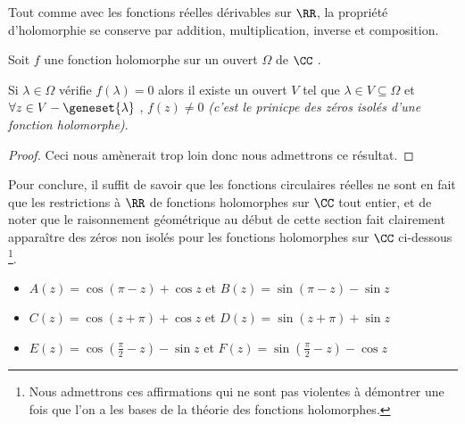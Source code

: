 \medskip

Tout comme avec les fonctions réelles dérivables sur $\RR$, la propriété d'holomorphie se conserve par addition, multiplication, inverse et composition.


\medskip

\begin{fact} \label{holo-nullity}
	Soit $f$ une fonction holomorphe sur un ouvert $\Omega$ de $\CC$ . 
	
	\smallskip
	
	Si $\lambda \in \Omega$ vérifie $f(\lambda) = 0$ alors il existe un ouvert $V$ tel que $\lambda \in V \subseteq \Omega$ et $\forall z \in V - \geneset{\lambda}$ , $f(z) \neq 0$ 
	\emph{(c'est le prinicpe des zéros isolés d'une fonction holomorphe)}. 
\end{fact}


\begin{proof}
	Ceci nous amènerait trop loin donc nous admettrons ce résultat.
\end{proof}


\medskip

Pour conclure, il suffit de savoir que les fonctions circulaires réelles ne sont en fait que les restrictions à $\RR$ de fonctions holomorphes sur $\CC$ tout entier, et de noter que le raisonnement géométrique au début de cette section fait clairement apparaître des zéros non isolés pour les fonctions holomorphes sur $\CC$ ci-dessous
\footnote{
	Nous admettrons ces affirmations qui ne sont pas violentes à démontrer une fois que l'on a les bases de la théorie des fonctions holomorphes.
}.

\begin{itemize}[label=\small\textbullet]
	\item $A(z) = \cos (\pi - z) + \cos z$ 
	   et $B(z) =\sin (\pi - z) - \sin z$ 

	\smallskip
	\item $C(z) =\cos (z + \pi) + \cos z$ 
	   et $D(z) =\sin (z + \pi) + \sin z$

	\smallskip
	\item $E(z) =\cos \left( \frac{\pi}{2} - z \right) - \sin z$ 
	   et $F(z) =\sin \left( \frac{\pi}{2} - z \right) - \cos z$ 
\end{itemize}

